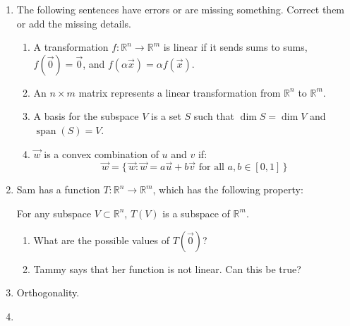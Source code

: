 \documentclass[red]{tutorial}
\newcommand{\R}{\mathbb{R}}
\DeclareMathOperator{\Span} {span}
\theoremstyle{definition}
\theoremstyle{theorem}
\begin{document}
\begin{tutorial}
  \begin{enumerate}
    \item
      The following sentences have errors or are missing something. Correct
      them or add the missing details.
      \begin{enumerate}
        \item
          A transformation $f\colon\R^n\to \R^m$ is linear if it sends sums to
          sums, $f(\vec0) = \vec0$, and $f(\alpha \vec x) = \alpha f(\vec x)$.
        \item
          An $n\times m$ matrix represents a linear transformation from $\R^n$
          to $\R^m$.
        \item
          A basis for the subspace $V$ is a set $S$ such that $\dim S = \dim V$
          and $\Span(S) = V$.
        \item
          $\vec w$ is a convex combination of $u$ and $v$ if:
          \begin{equation*}
            \vec w =
            \bigl\{\,\vec w:\vec w = a\vec u %
              +b\vec v \text{ for all } a,b\in [0,1]\,
            \bigr\}
          \end{equation*}
      \end{enumerate}
    \item
      Sam has a function $T\colon\R^n\to \R^m$, which has the following
      property:
      \begin{center}
        For any subspace $V\subset \R^n$, $T(V)$ is a subspace of $\R^m$.
      \end{center}
      \begin{enumerate}
        \item
          What are the possible values of $T(\vec0)$?
        \item
          Tammy says that her function is not linear. Can this be true?
      \end{enumerate}
    \item
      Orthogonality. %
    \item
      \newcommand{\pmin}{\phantom{-}}
      \newcommand{\row}[1]{\mathrm{r}_{#1}}

\end{enumerate}
\end{tutorial}
\end{document}
